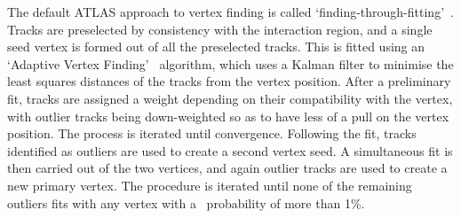 The default ATLAS approach to vertex finding is called
`finding-through-fitting'~\cite{1742-6596-119-3-032033}. Tracks are preselected
by consistency with the interaction region, and a single seed vertex is formed
out of all the preselected tracks. This is fitted using an `Adaptive Vertex
Finding'~\cite{0954-3899-34-12-N01} algorithm, which uses a Kalman filter to
minimise the least squares distances of the tracks from the vertex position.
After a preliminary fit, tracks are assigned a weight depending on their
compatibility with the vertex, with outlier tracks being down-weighted so as to
have less of a pull on the vertex position. The process is iterated until
convergence.  Following the fit, tracks identified as outliers are used to
create a second vertex seed. A simultaneous fit is then carried out of the two
vertices, and again outlier tracks are used to create a new primary vertex. The
procedure is iterated until none of the remaining outliers fits with any vertex
with a \chisquared\ probability of more than 1\%.
